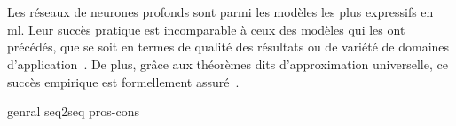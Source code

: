 
\section{}
\label{sec.mlp}

Les réseaux de neurones profonds sont parmi les modèles les plus expressifs en \gls{ml}.
Leur succès pratique est incomparable à ceux des modèles qui les ont précédés, 
que se soit en termes de qualité des résultats ou de variété de domaines d'application~\cite{Raschka_Mirjalili_2017}.
De plus, grâce aux théorèmes dits d'approximation universelle, 
ce succès empirique est formellement assuré~\parencite{Calin_2020}.

{genral}
{seq2seq}
{pros-cons}